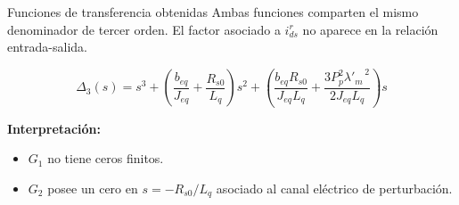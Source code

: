 \documentclass[aspectratio=169,t]{beamer}
\begin{document}
\begin{frame}{Funciones de transferencia obtenidas}
{\small\color{uncGray}Ambas funciones comparten el mismo denominador de tercer orden. El factor asociado a $i_{ds}^{r}$ no aparece en la relación entrada-salida.}\par
\vspace{2mm}

\small
\begin{equation*}
\Delta_3(s)=
s^3+
\left(\frac{b_{eq}}{J_{eq}}+\frac{R_{s0}}{L_q}\right)s^2+
\left(\frac{b_{eq}R_{s0}}{J_{eq}L_q}+
\frac{3P_p^2{\lambda'_m}^{\,2}}{2J_{eq}L_q}\right)s
\end{equation*}

\vspace{2mm}
\normalsize

\vspace{3mm}
\textbf{Interpretación:}
\begin{itemize}
  \item $G_1$ no tiene ceros finitos.
  \item $G_2$ posee un cero en $s=-R_{s0}/L_q$ asociado al canal eléctrico de perturbación.
\end{itemize}
\end{frame}
\end{document}
